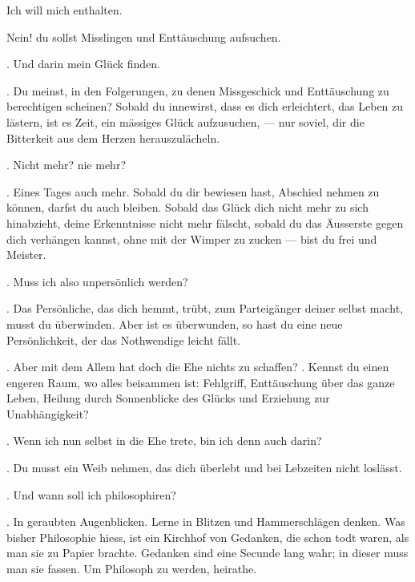  Ich will mich enthalten.
\par

 Nein! du sollst Misslingen und Enttäuschung aufsuchen.
\par

. Und darin mein Glück finden.
\par

. Du meinst, in den Folgerungen, zu denen Missgeschick und Enttäuschung zu berechtigen scheinen? Sobald du innewirst, dass es dich erleichtert, das Leben zu lästern, ist es Zeit, ein mässiges Glück aufzusuchen, — nur soviel, dir die Bitterkeit aus dem Herzen herauszulächeln.
\par

. Nicht mehr? nie mehr?
\par

. Eines Tages auch mehr. Sobald du dir bewiesen hast, Abschied nehmen zu können, darfst du auch bleiben. Sobald das Glück dich nicht mehr zu sich hinabzieht, deine Erkenntnisse nicht mehr fälscht, sobald du das Äusserste gegen dich verhängen kannst, ohne mit der Wimper zu zucken — bist du frei und Meister.
\par

. Muss ich also unpersönlich werden?
\par

. Das Persönliche, das dich hemmt, trübt, zum Parteigänger deiner selbst macht, musst du überwinden. Aber ist es überwunden, so hast du eine neue Persönlichkeit, der das Nothwendige leicht fällt.
\par

. Aber mit dem Allem hat doch die Ehe nichts zu schaffen? . Kennst du einen engeren Raum, wo alles beisammen ist: Fehlgriff, Enttäuschung über das ganze Leben, Heilung durch Sonnenblicke des Glücks und Erziehung zur Unabhängigkeit?
\par

. Wenn ich nun selbst in die Ehe trete, bin ich denn auch darin?
\par

. Du musst ein Weib nehmen, das dich überlebt und bei Lebzeiten nicht loslässt.
\par

. Und wann soll ich philosophiren?
\par

. In geraubten Augenblicken. Lerne in Blitzen und Hammerschlägen denken. Was bisher Philosophie hiess, ist ein Kirchhof von Gedanken, die schon todt waren, als man sie zu Papier brachte. Gedanken sind eine Secunde lang wahr; in dieser muss man sie fassen. Um Philosoph zu werden, heirathe.
\par

